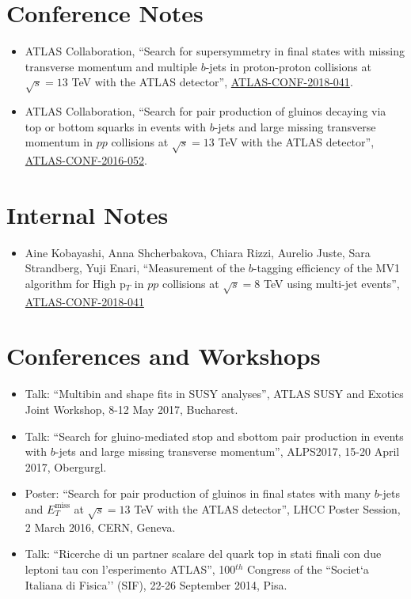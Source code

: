 \documentclass[11pt,a4paper]{moderncv}
\begin{document}
\section{Conference Notes}
\begin{itemize}
\item  ATLAS Collaboration, ``Search for supersymmetry in final states with missing transverse momentum and multiple $b$-jets in proton-proton collisions at $\sqrt{s} = 13$ TeV with the ATLAS detector'', \href{https://cds.cern.ch/record/2632347}{\color{color1}ATLAS-CONF-2018-041}.
\item  ATLAS Collaboration, ``Search for pair production of gluinos decaying via top or bottom squarks in events with $b$-jets and large missing transverse momentum in
$pp$ collisions at $\sqrt{s} = 13$ TeV with the ATLAS detector'', \href{https://atlas.web.cern.ch/Atlas/GROUPS/PHYSICS/CONFNOTES/ATLAS-CONF-2016-052/}{\color{color1}ATLAS-CONF-2016-052}.
\end{itemize}

\section{Internal Notes}
\begin{itemize}
\item  Aine Kobayashi, Anna Shcherbakova, Chiara Rizzi, Aurelio Juste, Sara Strandberg, Yuji Enari, ``Measurement of the $b$-tagging efficiency of the MV1 algorithm for High p$_T$ in $pp$ collisions at $\sqrt{s} = 8$ TeV using multi-jet events'', \href{https://cds.cern.ch/record/2032163}{\color{color1}ATLAS-CONF-2018-041}
\end{itemize}

\section{Conferences and Workshops}
\begin{itemize}
\item Talk: ``Multibin and shape fits in SUSY analyses'', ATLAS SUSY and Exotics Joint Workshop, 8-12 May 2017, Bucharest.
\item Talk: ``Search for gluino-mediated stop and sbottom pair production in events with $b$-jets and large missing transverse momentum'', ALPS2017, 15-20 April 2017, Obergurgl.
\item Poster: ``Search for pair production of gluinos in final states with many $b$-jets and $E_T^{\mathrm{miss}}$ at $\sqrt{s}=13$ TeV with the ATLAS detector'', LHCC Poster Session, 2 March 2016, CERN, Geneva.
\item Talk: ``Ricerche di un partner scalare del quark top in stati finali con due leptoni tau con l'esperimento ATLAS'', 100$^{th}$ Congress of the “Societ`a Italiana di Fisica'' (SIF), 22-26 September 2014, Pisa.
\end{itemize}
\end{document}
